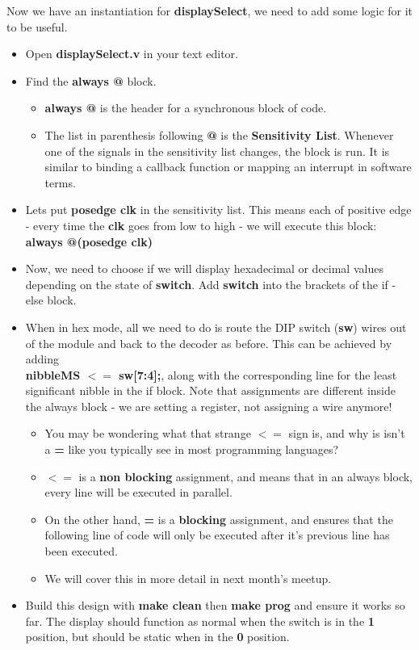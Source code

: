 \documentclass[12pt,a4paper]{article}
\begin{document}
\noindent
Now we have an instantiation for \textbf{displaySelect}, we need to add some logic for it to be useful.
\begin{itemize}
	\item Open \textbf{displaySelect.v} in your text editor. 
	\item Find the \textbf{always @} block.
	\begin{itemize}
		\item \textbf{always @} is the header for a synchronous block of code.
		\item The list in parenthesis following \textbf{@} is the \textbf{Sensitivity List}. Whenever one of the signals in the sensitivity list changes, the block is run. It is similar to binding a callback function or mapping an interrupt in software terms. 
	\end{itemize} 
		\item Lets put \textbf{posedge clk} in the sensitivity list. This means each of positive edge - every time the \textbf{clk} goes from low to high - we will execute this block: \textbf{always @(posedge clk)}
		\item Now, we need to choose if we will display hexadecimal or decimal values depending on the state of \textbf{switch}. Add \textbf{switch} into the brackets of the if - else block. 
		\item When in hex mode, all we need to do is route the DIP switch (\textbf{sw}) wires out of the module and back to the decoder as before. This can be achieved by adding \\ \textbf{nibbleMS $<=$ sw[7:4];}, along with the corresponding line for the least significant nibble in the if block. Note that assignments are different inside the always block - we are setting a register, not assigning a wire anymore! 
		\begin{itemize}
			\item You may be wondering what that strange \textbf{$<=$} sign is, and why is isn't a \textbf{=} like you typically see in most programming languages?
			\item \textbf{$<=$} is a \textbf{non blocking} assignment, and means that in an always block, every line will be executed in parallel. 
			\item On the other hand, \textbf{=} is a \textbf{blocking} assignment, and ensures that the following line of code will only be executed after it's previous line has been executed. 
			\item We will cover this in more detail in next month's meetup.
		\end{itemize}
		\item Build this design with \textbf{make clean} then \textbf{make prog} and ensure it works so far. The display should function as normal when the switch is in the \textbf{1} position, but should be static when in the \textbf{0} position. 
	\end{itemize}
\end{document}
